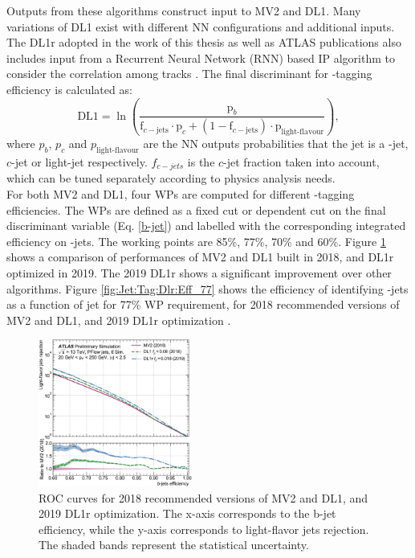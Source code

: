 Outputs from these algorithms construct input to MV2 and DL1. Many variations of DL1 exist with different NN configurations and additional inputs. The DL1r adopted in the work of this thesis as well as ATLAS publications also includes input from a Recurrent Neural Network (RNN) based IP algorithm to consider the correlation among tracks \cite{DL1r}. The final discriminant for \bq-tagging efficiency is calculated as:
\begin{equation}
    \mathrm{DL} 1=\ln \left(\frac{\mathrm{p}_{b}}{\mathrm{f}_{c-\mathrm{jets}} \cdot \mathrm{p}_{c}+\left(1-\mathrm{f}_{c-\mathrm{jets}}\right) \cdot \mathrm{p}_{\text{light-flavour}}}\right),
    \label{b-jet}
\end{equation}
where $p_b$, $p_c$ and $p_{\text{light-flavour}}$ are the NN outputs probabilities that the jet is a \bq-jet, $c$-jet or light-jet respectively. $f_{c-jets}$ is the $c$-jet fraction taken into account, which can be tuned separately according to physics analysis needs. \\  
For both MV2 and DL1, four WPs are computed for different \bq-tagging efficiencies. The WPs are defined as a fixed cut or \pT dependent cut on the final discriminant variable (Eq. \ref{b-jet}) and labelled with the corresponding integrated efficiency on \bq-jets. The working points are 85\%, 77\%, 70\% and 60\%. Figure \ref{fig:Jet:Tag:Dlr:Eff} shows a comparison of performances of MV2 and DL1 built in 2018, and DL1r optimized in 2019. The 2019 DL1r shows a significant improvement over other algorithms. Figure \ref{fig:Jet:Tag:Dlr:Eff_77} shows the efficiency of identifying \bq-jets as a function of jet \pT for 77\% WP requirement, for 2018 recommended versions of MV2 and DL1, and 2019 DL1r optimization \cite{Btag_Perf}. 
\begin{figure}[htbp]
    \centering
    \includegraphics[width=0.45\textwidth]{Ch4/Img/b_jet_Eff.png}
    \caption{ROC curves for 2018 recommended versions of MV2 and DL1, and 2019 DL1r optimization. The x-axis corresponds to the b-jet efficiency, while the y-axis corresponds to light-flavor jets rejection. The shaded bands represent the statistical uncertainty.}
    \label{fig:Jet:Tag:Dlr:Eff}
\end{figure}

